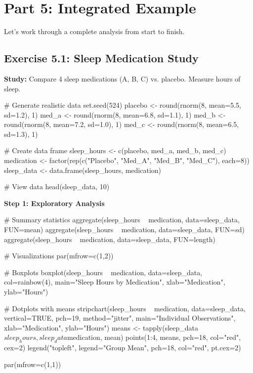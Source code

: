 \documentclass[11pt]{article}
\begin{document}
\section{Part 5: Integrated Example}

Let's work through a complete analysis from start to finish.

\subsection{Exercise 5.1: Sleep Medication Study}

\textbf{Study:} Compare 4 sleep medications (A, B, C) vs. placebo. Measure hours of sleep.

\begin{rcode}
# Generate realistic data
set.seed(524)
placebo <- round(rnorm(8, mean=5.5, sd=1.2), 1)
med_a <- round(rnorm(8, mean=6.8, sd=1.1), 1)
med_b <- round(rnorm(8, mean=7.2, sd=1.0), 1)
med_c <- round(rnorm(8, mean=6.5, sd=1.3), 1)

# Create data frame
sleep_hours <- c(placebo, med_a, med_b, med_c)
medication <- factor(rep(c("Placebo", "Med_A", "Med_B", "Med_C"),
                         each=8))
sleep_data <- data.frame(sleep_hours, medication)

# View data
head(sleep_data, 10)
\end{rcode}

\newpage

\textbf{Step 1: Exploratory Analysis}

\begin{rcode}
# Summary statistics
aggregate(sleep_hours ~ medication, data=sleep_data, FUN=mean)
aggregate(sleep_hours ~ medication, data=sleep_data, FUN=sd)
aggregate(sleep_hours ~ medication, data=sleep_data, FUN=length)

# Visualizations
par(mfrow=c(1,2))

# Boxplots
boxplot(sleep_hours ~ medication, data=sleep_data,
        col=rainbow(4),
        main="Sleep Hours by Medication",
        xlab="Medication", ylab="Hours")

# Dotplots with means
stripchart(sleep_hours ~ medication, data=sleep_data,
           vertical=TRUE, pch=19, method="jitter",
           main="Individual Observations",
           xlab="Medication", ylab="Hours")
means <- tapply(sleep_data$sleep_hours,
                sleep_data$medication, mean)
points(1:4, means, pch=18, col="red", cex=2)
legend("topleft", legend="Group Mean",
       pch=18, col="red", pt.cex=2)

par(mfrow=c(1,1))
\end{rcode}
\end{document}
